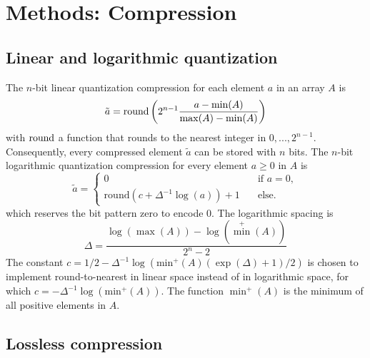 \section{Methods: Compression}
\label{sec:compression_methods_compression}

\subsection{Linear and logarithmic quantization}

The $n$-bit linear quantization compression for each element $a$ in an array $A$ is
	\begin{equation}
	\tilde{a} = \operatorname{round} \left( 2^{n-1} \frac{a - \min(A)}{\max(A) - \min(A)} \right)
	\end{equation}
with $\operatorname{round}$ a function that rounds to the nearest integer in $0,...,2^{n-1}$. Consequently, every compressed element $\tilde{a}$
can be stored with $n$ bits. The $n$-bit logarithmic quantization compression for every element $a\geq0$ in $A$ is
	\begin{equation}
	\tilde{a} = \begin{cases} 0 \quad &\text{if } a = 0, \\
	\text{round}\left( c + \Delta^{-1}\log(a) \right) + 1 \quad &\text{else.} \end{cases}
	\end{equation}
which reserves the bit pattern zero to encode 0. The logarithmic spacing is
	\begin{equation}
	\Delta = \frac{\log(\max(A)) - \log(\min^+(A))}{2^{n}-2}
	\end{equation}
The constant $c = 1/2 - \Delta^{-1}\log(\text{min}^+(A)(\exp(\Delta)+1)/2)$ is chosen to implement round-to-nearest in linear space
instead of in logarithmic space, for which $c=-\Delta^{-1}\log(\text{min}^+(A))$. The function $\min^+(A)$  is the minimum of all
positive elements in $A$.

\subsection{Lossless compression}

